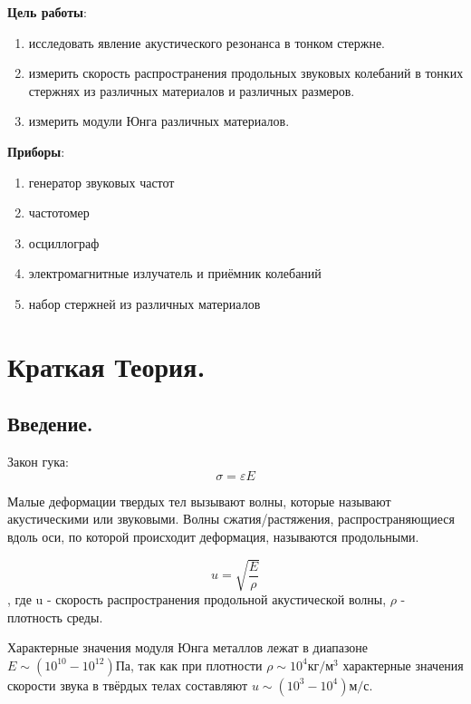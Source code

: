 \documentclass[a4paper,12pt]{article}
\numberwithin{equation}{section}
\begin{document}

\tableofcontents

\listoffigures

\listoftables

\newpage

\textbf{Цель работы}:
\begin{enumerate}
  \item исследовать явление акустического резонанса в тонком стержне.
  \item измерить скорость распространения продольных звуковых колебаний в тонких стержнях из различных материалов и различных размеров.
  \item измерить модули Юнга различных материалов.
\end{enumerate}

\textbf{Приборы}:
\begin{enumerate}
  \item генератор звуковых частот
  \item частотомер
  \item осциллограф
  \item электромагнитные излучатель и приёмник колебаний
  \item набор стержней из различных материалов
\end{enumerate}

\section{Краткая Теория.}
\subsection{Введение.}
Закон гука:
\begin{equation}
  \sigma =  \varepsilon E
  \label{eq:1}
\end{equation}

Малые деформации твердых тел вызывают волны, которые называют акустическими или звуковыми.
Волны сжатия/растяжения, распространяющиеся вдоль оси, по которой происходит деформация, называются продольными.

\begin{equation}
  u =  \sqrt{\frac{E}{\rho}}
  \label{eq:2}
\end{equation}
, где u - скорость распространения продольной акустической волны, 
$\rho$ - плотность среды.

Характерные значения модуля Юнга металлов лежат в диапазоне $E \sim (10^{10} - 10^{12}) \text{Па}$, так как при плотности $\rho \sim 10^4 \text{кг}/\text{м}^3$ характерные значения скорости звука в
твёрдых телах составляют $u \sim (10^3 - 10^4) \text{м/с}$.
\end{document}
